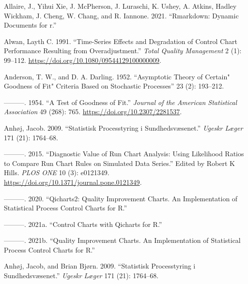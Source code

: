 \documentclass[
]{book}
\newlength{\cslhangindent}
\newenvironment{CSLReferences}[2] %
 {%
  \setlength{\parindent}{0pt}
  \ifodd #1 \everypar{\setlength{\hangindent}{\cslhangindent}}\ignorespaces\fi
  \ifnum #2 > 0
  \setlength{\parskip}{#2\baselineskip}
  \fi
 }%
 {}
\begin{document}
\hypertarget{refs}{}
\begin{CSLReferences}{1}{0}
\leavevmode{}%
Allaire, J., Yihui Xie, J. McPherson, J. Luraschi, K. Ushey, A. Atkins, Hadley Wickham, J. Cheng, W. Chang, and R. Iannone. 2021. {``Rmarkdown: Dynamic Documents for r.''}

\leavevmode{}%
Alwan, Layth C. 1991. {``Time-Series Effects and Degradation of Control Chart Performance Resulting from Overadjustment.''} \emph{Total Quality Management} 2 (1): 99--112. \url{https://doi.org/10.1080/09544129100000009}.

\leavevmode{}%
Anderson, T. W., and D. A. Darling. 1952. {``Asymptotic Theory of Certain" Goodness of Fit" Criteria Based on Stochastic Processes''} 23 (2): 193--212.

\leavevmode{}%
---------. 1954. {``A Test of Goodness of Fit.''} \emph{Journal of the American Statistical Association} 49 (268): 765. \url{https://doi.org/10.2307/2281537}.

\leavevmode{}%
Anhøj, Jacob. 2009. {``Statistisk Processtyring i Sundhedsvæsenet.''} \emph{Ugeskr Læger} 171 (21): 1764--68.

\leavevmode{}%
---------. 2015. {``Diagnostic {Value} of {Run Chart Analysis}: Using {Likelihood Ratios} to {Compare Run Chart Rules} on {Simulated Data Series}.''} Edited by Robert K Hills. \emph{PLOS ONE} 10 (3): e0121349. \url{https://doi.org/10.1371/journal.pone.0121349}.

\leavevmode{}%
---------. 2020. {``Qicharts2: Quality {Improvement Charts}. {An} Implementation of Statistical Process Control Charts for {R}.''}

\leavevmode{}%
---------. 2021a. {``Control {Charts} with Qicharts for {R}.''}

\leavevmode{}%
---------. 2021b. {``Quality {Improvement Charts}. {An} Implementation of Statistical Process Control Charts for {R}.''}

\leavevmode{}%
Anhøj, Jacob, and Brian Bjørn. 2009. {``Statistisk Processtyring i Sundhedsvæsenet.''} \emph{Ugeskr Læger} 171 (21): 1764--68.


\end{CSLReferences}
\end{document}
